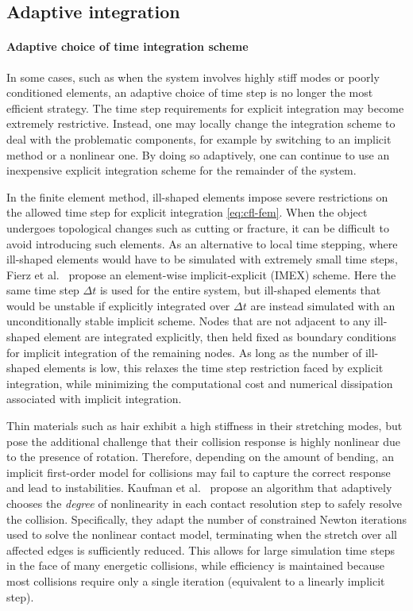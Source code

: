 \subsection{Adaptive integration}
\label{sec:adaptive-integration}

\paragraph*{Adaptive choice of time integration scheme}
In some cases, such as when the system involves highly stiff modes or poorly conditioned elements, an adaptive choice of time step is no longer the most efficient strategy.
The time step requirements for explicit integration may become extremely restrictive.
Instead, one may locally change the integration scheme to deal with the problematic components, for example by switching to an implicit method or a nonlinear one.
By doing so adaptively, one can continue to use an inexpensive explicit integration scheme for the remainder of the system.

In the finite element method, ill-shaped elements impose severe restrictions on the allowed time step for explicit integration \eqref{eq:cfl-fem}.
When the object undergoes topological changes such as cutting or fracture, it can be difficult to avoid introducing such elements.
As an alternative to local time stepping, where ill-shaped elements would have to be simulated with extremely small time steps, Fierz et al.~\cite{Fierz2011} propose an element-wise implicit-explicit (IMEX) scheme.
Here the same time step $\Delta t$ is used for the entire system, but ill-shaped elements that would be unstable if explicitly integrated over $\Delta t$ are instead simulated with an unconditionally stable implicit scheme.
Nodes that are not adjacent to any ill-shaped element are integrated explicitly, then held fixed as boundary conditions for implicit integration of the remaining nodes.
As long as the number of ill-shaped elements is low, this relaxes the time step restriction faced by explicit integration, while minimizing the computational cost and numerical dissipation associated with implicit integration.

Thin materials such as hair exhibit a high stiffness in their stretching modes, but pose the additional challenge that their collision response is highly nonlinear due to the presence of rotation.
Therefore, depending on the amount of bending, an implicit first-order model for collisions may fail to capture the correct response and lead to instabilities.
Kaufman et al.~\cite{Kaufman2014} propose an algorithm that adaptively chooses the \emph{degree} of nonlinearity in each contact resolution step to safely resolve the collision.
Specifically, they adapt the number of constrained Newton iterations used to solve the nonlinear contact model, terminating when the stretch over all affected edges is sufficiently reduced.
This allows for large simulation time steps in the face of many energetic collisions, while efficiency is maintained because most collisions require only a single iteration (equivalent to a linearly implicit step).

